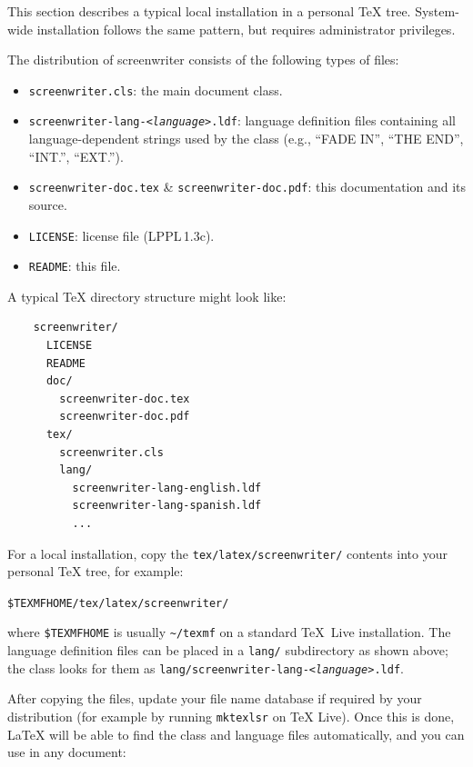 \documentclass[letterpaper]{article}
\newcommand{\meta}[1]{<\textit{#1}>}
\begin{document}
This section describes a typical local installation in a personal \TeX{}
tree.  System-wide installation follows the same pattern, but requires
administrator privileges.

The distribution of \textsf{screenwriter} consists of the following
types of files:

\begin{itemize}\itemsep0em
  \item \texttt{screenwriter.cls}: the main document class.
  \item \texttt{screenwriter-lang-\meta{language}.ldf}: language
        definition files containing all language-dependent strings used
        by the class (e.g., ``FADE IN'', ``THE END'', ``INT.'', ``EXT.'').
  \item \texttt{screenwriter-doc.tex} \& \texttt{screenwriter-doc.pdf}:
        this documentation and its source.
  \item \texttt{LICENSE}: license file (LPPL\,1.3c).
  \item \texttt{README}: this file.
\end{itemize}

A typical \TeX{} directory structure might look like:

\begin{verbatim}
    screenwriter/
      LICENSE
      README
      doc/
        screenwriter-doc.tex
        screenwriter-doc.pdf
      tex/
        screenwriter.cls
        lang/
          screenwriter-lang-english.ldf
          screenwriter-lang-spanish.ldf
          ...
\end{verbatim}

For a local installation, copy the \texttt{tex/latex/screenwriter/}
contents into your personal \TeX{} tree, for example:

\begin{center}
  \texttt{\$TEXMFHOME/tex/latex/screenwriter/}
\end{center}
where \texttt{\$TEXMFHOME} is usually \texttt{\~{}/texmf} on a standard
\TeX{}~Live installation.  The language definition files can be placed
in a \texttt{lang/} subdirectory as shown above; the class looks for
them as \texttt{lang/screenwriter-lang-\meta{language}.ldf}.

After copying the files, update your file name database if required by
your distribution (for example by running \texttt{mktexlsr} on \TeX{}
Live).  Once this is done, \LaTeX{} will be able to find the class and
language files automatically, and you can use in any document:
\end{document}
